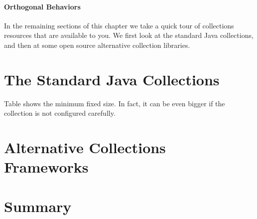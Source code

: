 \paragraph{Orthogonal Behaviors}

In the remaining sections of this chapter we take a quick tour of collections
resources that are available to you.  We first look at the standard Java
collections, and then at some open source alternative collection libraries.

\section{The Standard Java Collections}
Table shows the minimum fixed size.  In fact, it can be even bigger if the
collection is not configured carefully.
\section{Alternative Collections Frameworks}

\section{Summary}

